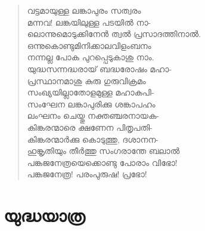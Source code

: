 \begin{verse}
വട്ടമായുള്ള ലങ്കാപുരം സത്വരം\\
മന്നവ! ലങ്കയിലുള്ള പടയില്‍ നാ-\\
ലൊന്നുമൊടുക്കിനേന്‍ ത്വല്‍ പ്രസാദത്തിനാല്‍.\\
ഒന്നുകൊണ്ടുമിനിക്കാലവിളംബനം\\
നന്നല്ല പോക പുറപ്പെടുകാശു നാം.\\
യുദ്ധസന്നദ്ധരായ് ബദ്ധരോഷം മഹാ-\\
പ്രസ്ഥാനമാശു കുരു ഗുരുവിക്രമം\\
സംഖ്യയില്ലാതോളമുള്ള മഹാകപി-\\
സംഘേന ലങ്കാപുരിക്കു ശങ്കാപഹം\\
ലംഘനം ചെയ്തു നക്തഞ്ചരനായക-\\
കിങ്കരന്മാരെ ക്ഷണേന പിതൃപതി-\\
കിങ്കരന്മാര്‍ക്കു കൊടുത്തു, ദശാനന-\\
ഹുങ്കൃതിയും തീര്‍ത്തു സംഗരാന്തേ ബലാല്‍\\
പങ്കജനേത്രയെക്കൊണ്ടു പോരാം വിഭോ!\\
പങ്കജനേത്ര! പരംപുരുഷ! പ്രഭോ!
\end{verse}


\section{യുദ്ധയാത്ര}

